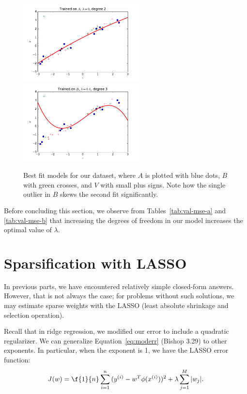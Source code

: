 \documentclass{article}
\begin{document}
\begin{multicols}{2}
\begin{figure}
   \centering
   \includegraphics[width=2.5in]{img/3-2_lambda0_degree2.pdf}
   \includegraphics[width=2.5in]{img/3-2_lambda6_degree3.pdf}
   \caption{Best fit models for our dataset, where $A$ is plotted with blue dots, $B$ with green crosses, and $V$ with small plus signs. Note how the single outlier in $B$ skews the second fit significantly.}
   \label{fig:3-2-bestfit}
\end{figure}

Before concluding this section, we observe from Tables~\ref{tab:val-mse-a} and \ref{tab:val-mse-b} that increasing the degrees of freedom in our model increases the optimal value of $\lambda$.



\section{Sparsification with LASSO}

In previous parts, we have encountered relatively simple closed-form answers. However, that is not always the case; for problems without such solutions, we may estimate sparse weights with the LASSO (least absolute shrinkage and selection operation).

Recall that in ridge regression, we modified our error to include a quadratic regularizer. We can generalize Equation~\ref{eq:moderr} (Bishop 3.29) to other exponents. In particular, when the exponent is 1, we have the LASSO error function:
\begin{equation}J(w) = \f{1}{n}\sum_{i=1}^n{(y^{(i)}-w^T\phi(x^{(i)}))^2} + \lambda \sum_{j=1}^M{|w_j|}.\end{equation}


\end{multicols}
\end{document}
